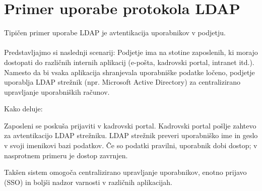 \documentclass{article}
\begin{document}
\section{Primer uporabe protokola LDAP}
Tipičen primer uporabe LDAP je avtentikacija uporabnikov v podjetju.
\paragraph{}
Predstavljajmo si naslednji scenarij: Podjetje ima na stotine zaposlenih, ki morajo dostopati do različnih internih aplikacij (e-pošta, kadrovski portal, intranet itd.). Namesto da bi vsaka aplikacija shranjevala uporabniške podatke ločeno, podjetje uporablja LDAP strežnik (npr. Microsoft Active Directory) za centralizirano upravljanje uporabniških računov.

Kako deluje:

    Zaposleni se poskuša prijaviti v kadrovski portal.
    Kadrovski portal pošlje zahtevo za avtentikacijo LDAP strežniku.
    LDAP strežnik preveri uporabniško ime in geslo v svoji imenikovi bazi podatkov.
    Če so podatki pravilni, uporabnik dobi dostop; v nasprotnem primeru je dostop zavrnjen.

Takšen sistem omogoča centralizirano upravljanje uporabnikov, enotno prijavo (SSO) in boljši nadzor varnosti v različnih aplikacijah.
\end{document}
